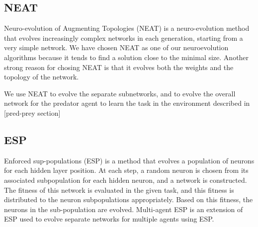 \subsection{NEAT}
\label{sec:NEAT}
Neuro-evolution of Augmenting Topologies (NEAT) \nocite{Stanley2002} is a neuro-evolution method that evolves increasingly complex networks in each generation, starting from a very simple network. We have chosen NEAT as one of our neuroevolution algorithms because it tends to find a solution close to the minimal size. Another strong reason for chosing NEAT is that it evolves both the weights and the topology of the network.

We use NEAT to evolve the separate subnetworks, and to evolve the overall network for the predator agent to learn the task in the environment described in [pred-prey section] 

\subsection{ESP}
\label{sec:ESP}
Enforced sup-populations (ESP) \nocite{Gomez1997} is a method that evolves a population of neurons for each hidden layer position. At each step, a random neuron is chosen from its associated subpopulation for each hidden neuron, and a network is constructed. The fitness of this network is evaluated in the given task, and this fitness is distributed to the neuron subpopulations appropriately. Based on this fitness, the neurons in the sub-population are evolved.
Multi-agent ESP is an extension of ESP used to evolve separate networks for multiple agents using ESP. 
